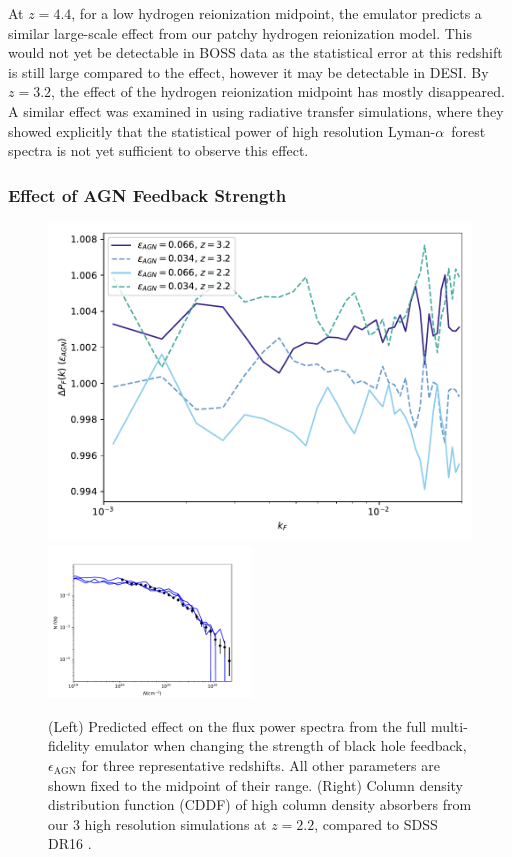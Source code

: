 \documentclass[a4paper,11pt]{article}
\newcommand{\Lya}{Lyman-$\alpha$}
\begin{document}
At $z=4.4$, for a low hydrogen reionization midpoint, the emulator predicts a similar large-scale effect from our patchy hydrogen reionization model. This would not yet be detectable in BOSS data as the statistical error at this redshift is still large compared to the effect, however it may be detectable in DESI. By $z=3.2$, the effect of the hydrogen reionization midpoint has mostly disappeared. A similar effect was examined in \cite{Molaro:2022} using radiative transfer simulations, where they showed explicitly that the statistical power of high resolution \Lya~forest spectra is not yet sufficient to observe this effect.

\subsubsection{Effect of AGN Feedback Strength}

\begin{figure}
\centering
\includegraphics[width=0.48\columnwidth]{figures/single_param_bhfeedback.pdf}
\includegraphics[width=0.48\textwidth]{figures/cddf_hires.pdf}
 \caption{(Left) Predicted effect on the flux power spectra from the full multi-fidelity emulator when changing the strength of black hole feedback, $\epsilon_\mathrm{AGN}$ for three representative redshifts. All other parameters are shown fixed to the midpoint of their range. (Right) Column density distribution function (CDDF) of high column density absorbers from our $3$ high resolution simulations at $z=2.2$, compared to SDSS DR16 \cite{2021MNRAS.507..704H}.}
 \label{fig:DLACDDF}
\end{figure}
\end{document}
